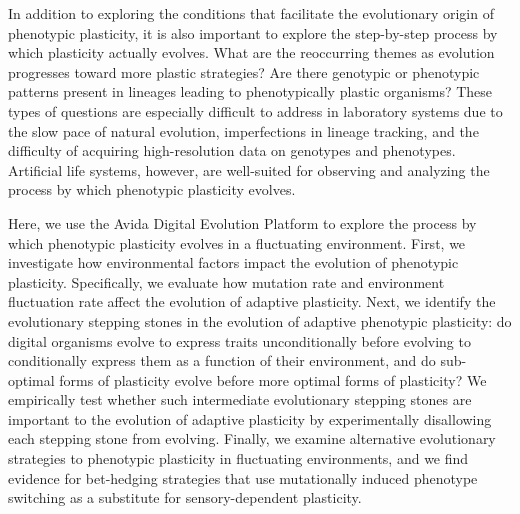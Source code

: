In addition to exploring the conditions that facilitate the evolutionary origin of phenotypic plasticity, it is also important to explore the step-by-step process by which plasticity actually evolves. 
What are the reoccurring themes as evolution progresses toward more plastic strategies?
Are there genotypic or phenotypic patterns present in lineages leading to phenotypically plastic organisms? 
These types of questions are especially difficult to address in laboratory systems due to the slow pace of natural evolution, imperfections in lineage tracking, and the difficulty of acquiring high-resolution data on genotypes and phenotypes. 
Artificial life systems, however, are well-suited for observing and analyzing the process by which phenotypic plasticity evolves. 

Here, we use the Avida Digital Evolution Platform \citep{ofria_avida:_2009} to explore the process by which phenotypic plasticity evolves in a fluctuating environment. 
First, we investigate how environmental factors impact the evolution of phenotypic plasticity.
Specifically, we evaluate how mutation rate and environment fluctuation rate affect the evolution of adaptive plasticity.
Next, we identify the evolutionary stepping stones in the evolution of adaptive phenotypic plasticity: do digital organisms evolve to express traits unconditionally before evolving to conditionally express them as a function of their environment, and do sub-optimal forms of plasticity evolve before more optimal forms of plasticity? 
We empirically test whether such intermediate evolutionary stepping stones are important to the evolution of adaptive plasticity by experimentally disallowing each stepping stone from evolving. 
Finally, we examine alternative evolutionary strategies to phenotypic plasticity in fluctuating environments, and we find evidence for bet-hedging strategies that use mutationally induced phenotype switching as a substitute for sensory-dependent plasticity.   